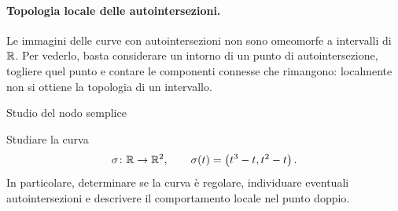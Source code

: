 \documentclass[a4paper]{article}
\begin{document}
\paragraph{Topologia locale delle autointersezioni.}
Le immagini delle curve con autointersezioni non sono omeomorfe a intervalli di \(\mathbb{R}\). Per vederlo, basta considerare un intorno di un punto di autointersezione, togliere quel punto e contare le componenti connesse che rimangono: localmente non si ottiene la topologia di un intervallo.



\begin{snippetexercise}{Studio del nodo semplice}
    \begin{figure}
        \vspace{-1cm}
    \end{figure}
    Studiare la curva
    \[
        \sigma\colon\mathbb{R}\to\mathbb{R}^2,
        \qquad
        \sigma(t)=\left(t^3-t,t^2-t\right).
    \]
    In particolare, determinare se la curva è regolare, individuare
    eventuali autointersezioni e descrivere il comportamento locale nel
    punto doppio. \wrapfill
\end{snippetexercise}
\end{document}
